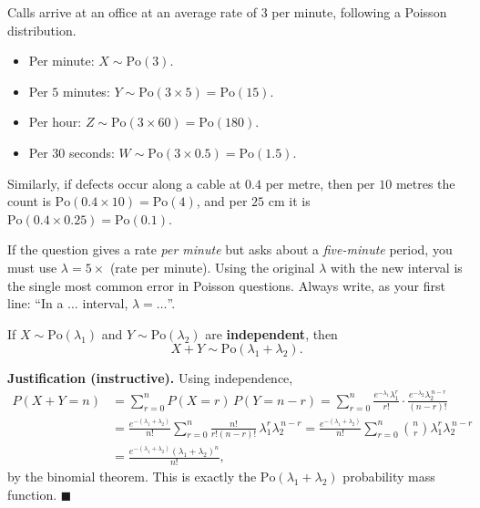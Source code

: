 \documentclass[11pt]{article}
\begin{document}
\begin{exemplebox}
Calls arrive at an office at an average rate of $3$ per minute, following a Poisson distribution.
\begin{itemize}
\item Per minute: $X \sim \mathrm{Po}(3)$.
\item Per $5$ minutes: $Y \sim \mathrm{Po}(3 \times 5) = \mathrm{Po}(15)$.
\item Per hour: $Z \sim \mathrm{Po}(3 \times 60) = \mathrm{Po}(180)$.
\item Per $30$ seconds: $W \sim \mathrm{Po}(3 \times 0.5) = \mathrm{Po}(1.5)$.
\end{itemize}
Similarly, if defects occur along a cable at $0.4$ per metre, then per $10$ metres the count is $\mathrm{Po}(0.4 \times 10) = \mathrm{Po}(4)$, and per $25$ cm it is $\mathrm{Po}(0.4 \times 0.25) = \mathrm{Po}(0.1)$.
\end{exemplebox}

\begin{attention}
If the question gives a rate \emph{per minute} but asks about a \emph{five-minute} period, you must use $\lambda = 5 \times$ (rate per minute). Using the original $\lambda$ with the new interval is the single most common error in Poisson questions. Always write, as your first line: ``In a $\ldots$ interval, $\lambda = \ldots$''.
\end{attention}

\begin{propriete}
If $X \sim \mathrm{Po}(\lambda_1)$ and $Y \sim \mathrm{Po}(\lambda_2)$ are \textbf{independent}, then
\[
X + Y \sim \mathrm{Po}(\lambda_1 + \lambda_2).
\]
\end{propriete}

\textbf{Justification (instructive).} Using independence,
\begin{align*}
P(X+Y = n) &= \sum_{r=0}^{n} P(X=r)\,P(Y=n-r)
= \sum_{r=0}^{n} \frac{e^{-\lambda_1}\lambda_1^{r}}{r!}\cdot\frac{e^{-\lambda_2}\lambda_2^{\,n-r}}{(n-r)!} \\
&= \frac{e^{-(\lambda_1+\lambda_2)}}{n!}\sum_{r=0}^{n} \frac{n!}{r!(n-r)!}\,\lambda_1^{r}\lambda_2^{\,n-r}
= \frac{e^{-(\lambda_1+\lambda_2)}}{n!}\sum_{r=0}^{n} \binom{n}{r}\lambda_1^{r}\lambda_2^{\,n-r} \\
&= \frac{e^{-(\lambda_1+\lambda_2)}(\lambda_1+\lambda_2)^{n}}{n!},
\end{align*}
by the binomial theorem. This is exactly the $\mathrm{Po}(\lambda_1+\lambda_2)$ probability mass function. $\blacksquare$
\end{document}
